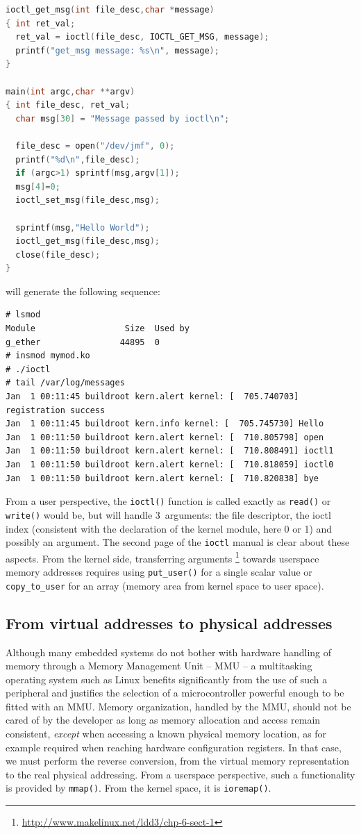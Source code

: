 \documentclass{article}
\begin{document}
{{{\begin{lstlisting}[language=C]
ioctl_get_msg(int file_desc,char *message)
{ int ret_val;
  ret_val = ioctl(file_desc, IOCTL_GET_MSG, message);
  printf("get_msg message: %s\n", message);
}

main(int argc,char **argv)
{ int file_desc, ret_val;
  char msg[30] = "Message passed by ioctl\n";

  file_desc = open("/dev/jmf", 0);
  printf("%d\n",file_desc);
  if (argc>1) sprintf(msg,argv[1]);
  msg[4]=0;
  ioctl_set_msg(file_desc,msg);

  sprintf(msg,"Hello World");
  ioctl_get_msg(file_desc,msg);
  close(file_desc); 
}
\end{lstlisting}

will generate the following sequence:

\begin{verbatim}
# lsmod
Module                  Size  Used by
g_ether                44895  0 
# insmod mymod.ko
# ./ioctl 
# tail /var/log/messages 
Jan  1 00:11:45 buildroot kern.alert kernel: [  705.740703] registration success
Jan  1 00:11:45 buildroot kern.info kernel: [  705.745730] Hello
Jan  1 00:11:50 buildroot kern.alert kernel: [  710.805798] open
Jan  1 00:11:50 buildroot kern.alert kernel: [  710.808491] ioctl1
Jan  1 00:11:50 buildroot kern.alert kernel: [  710.818059] ioctl0
Jan  1 00:11:50 buildroot kern.alert kernel: [  710.820838] bye
\end{verbatim}

From a user perspective, the {\tt ioctl()} function is called exactly as 
{\tt read()} or {\tt write()} would be, but will handle 3~arguments: the file descriptor, the
ioctl index (consistent with the declaration of the kernel module, here 0 or 1) and possibly
an argument. The second page of the {\tt ioctl} manual is clear about these aspects. From the
kernel side, transferring arguments \footnote{\url{http://www.makelinux.net/ldd3/chp-6-sect-1}} 
towards userspace memory addresses requires using {\tt put\_user()} for a single scalar value
or {\tt copy\_to\_user} for an array (memory area from kernel space to user space).

\subsection{From virtual addresses to physical addresses}

Although many embedded systems do not bother with hardware handling of memory through a
Memory Management Unit -- MMU -- a multitasking operating system such as Linux benefits
significantly from the use of such a peripheral and justifies the selection of a microcontroller
powerful enough to be fitted with an MMU. Memory organization, handled by the MMU, should not
be cared of by the developer as long as memory allocation and access remain consistent,
{\em except} when accessing a known physical memory location, as for example required when 
reaching hardware configuration registers. In that case, we must perform the reverse conversion,
from the virtual memory representation to the real physical addressing. From a userspace perspective,
such a functionality is provided by {\tt mmap()}. From the kernel space, it is {\tt ioremap()}.

}}}
\end{document}
